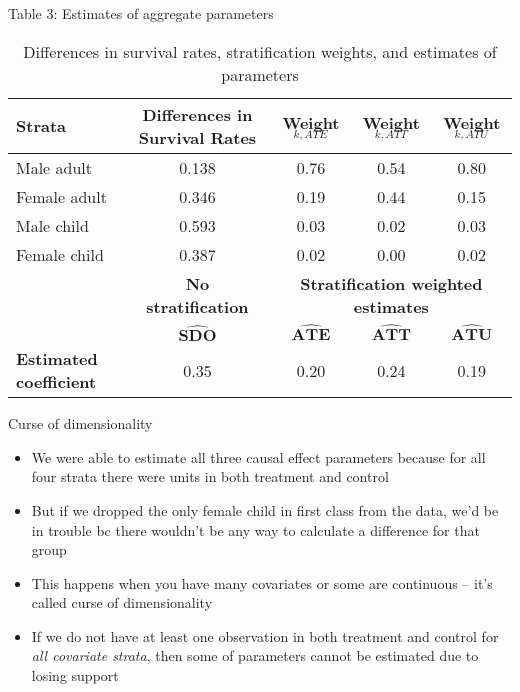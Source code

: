 \documentclass{beamer}
\begin{document}
\begin{frame}{Table 3: Estimates of aggregate parameters}

{\renewcommand{\arraystretch}{1.1}
\tabcolsep 		
\begin{table}\tiny{}
\caption{Differences in survival rates, stratification weights, and estimates of parameters}
\centering
\begin{tabular}{lc|ccc}
\toprule
\multicolumn{1}{l}{\textbf{Strata}}&
\multicolumn{1}{c}{\textbf{Differences in Survival Rates}}&
\multicolumn{1}{c}{\textbf{Weight$_{k,ATE}$}}&
\multicolumn{1}{c}{\textbf{Weight$_{k,ATT}$}}&
\multicolumn{1}{c}{\textbf{Weight$_{k,ATU}$}}\\
\midrule
Male adult		& 0.138 &	0.76 &	0.54	&0.80	\\
Female adult	& 0.346 &	0.19 &	0.44	&0.15	\\
Male child		& 0.593 &	0.03 &	0.02	&0.03	\\
Female child	& 0.387 &	0.02 &	0.00	&0.02	\\
\midrule
\multicolumn{1}{l}{\textbf{}}&
\multicolumn{1}{c}{\textbf{No stratification}}&
\multicolumn{3}{c}{\textbf{Stratification weighted estimates}}\\

 & $\widehat{\textbf{SDO}}$& $\widehat{\textbf{ATE}}$ & $\widehat{\textbf{ATT}}$ & $\widehat{\textbf{ATU}}$ \\
\midrule
\textbf{Estimated coefficient}& 0.35 & 0.20 & 	0.24	 & 0.19   \\
\bottomrule
\end{tabular}
\label{tab:titanic-weights}
\end{table}}



\end{frame}



\begin{frame}{Curse of dimensionality}

\begin{itemize}
\item We were able to estimate all three causal effect parameters because for all four strata there were units in both treatment and control
\item But if we dropped the only female child in first class from the data, we'd be in trouble bc there wouldn't be any way to calculate a difference for that group
\item This happens when you have many covariates or some are continuous -- it's called curse of dimensionality
\item If we do not have at least one observation in both treatment and control for \emph{all covariate strata}, then some of parameters cannot be estimated due to losing support

\end{itemize}

\end{frame}
\end{document}
